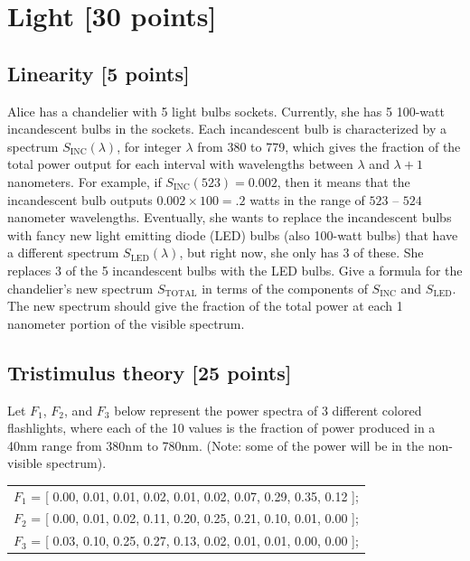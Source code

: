\documentclass[10pt,letterpaper]{article}
\begin{document}
\newpage
\section{Light [30 points]}
\subsection{Linearity [5 points]}
Alice has a chandelier with 5 light
bulbs sockets. Currently, she has 5 100-watt incandescent bulbs in the sockets.
Each incandescent bulb is characterized by a spectrum $S_{\text{INC}}(\lambda)$, for integer $\lambda$
from 380 to 779, which gives the fraction of the total power output for each
interval with wavelengths between $\lambda$ and $\lambda + 1$ nanometers. For example, if
$S_{\text{INC}}(523) = 0.002$, then it means that the incandescent bulb outputs $0.002 \times
100 = .2$ watts in the range of $523$ -- $524$ nanometer wavelengths.
Eventually, she wants to replace the incandescent bulbs with fancy new
light emitting diode (LED) bulbs (also 100-watt bulbs) that have a different
spectrum $S_{\text{LED}}(\lambda)$, but right now, she only has 3 of these. She replaces 3 of the 5
incandescent bulbs with the LED bulbs. Give a formula for the chandelier’s new
spectrum $S_{\text{TOTAL}}$ in terms of the components of $S_{\text{INC}}$ and $S_{\text{LED}}$. The new spectrum
should give the fraction of the total power at each 1 nanometer portion of the
visible spectrum.

\vspace{1in}

\subsection{Tristimulus theory [25 points]} Let $F_1$, $F_2$, and $F_3$ below
represent the power spectra of 3 different colored flashlights, where each of the 10 values is the fraction of power produced in a 40nm range from 380nm to 780nm. (Note: some of the power will be in the non-visible spectrum).\\

\begin{tabular}{c}
$F_1$ = [ 0.00, 0.01, 0.01, 0.02, 0.01, 0.02, 0.07, 0.29, 0.35, 0.12 ];\\
$F_2$ = [ 0.00, 0.01, 0.02, 0.11, 0.20, 0.25, 0.21, 0.10, 0.01, 0.00 ];\\
$F_3$ = [ 0.03, 0.10, 0.25, 0.27, 0.13, 0.02, 0.01, 0.01, 0.00, 0.00 ];\\
\end{tabular} \\
\end{document}
